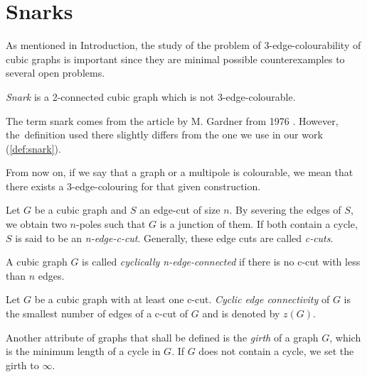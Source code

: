 \section{Snarks}\label{sec:snarks}

As mentioned in Introduction, the study of the problem of 3-edge-colourability of cubic graphs is important since they are minimal possible counterexamples to several open problems.



\begin{definition}\label{def:snark}
	\textit{Snark} is a 2-connected cubic graph which is not 3-edge-colourable.
\end{definition}

The term snark comes from the article by M. Gardner from 1976 \cite{Gardner1976}. However, the~definition used there slightly differs from the one we use in our work (\cref{def:snark}).

From now on, if we say that a graph or a multipole is colourable, we mean that there exists a 3-edge-colouring for that given construction.

Let $G$ be a cubic graph and $S$ an edge-cut of size $n$. By severing the edges of $S$, we obtain two $n$-poles such that $G$ is a junction of them. If both contain a cycle, $S$ is said to be an \textit{n-edge-c-cut}. Generally, these edge cuts are called \textit{c-cuts}. 

A cubic graph $G$ is called \textit{cyclically n-edge-connected} if there is no c-cut with less than $n$ edges.

\begin{definition}
	Let $G$ be a cubic graph with at least one c-cut. \textit{Cyclic edge connectivity} of $G$ is the smallest number of edges of a c-cut of $G$ and is denoted by $z(G)$.
\end{definition}

Another attribute of graphs that shall be defined is the \textit{girth} of a graph $G$, which is the minimum length of a cycle in $G$. If $G$ does not contain a cycle, we set the girth to $\infty$.

